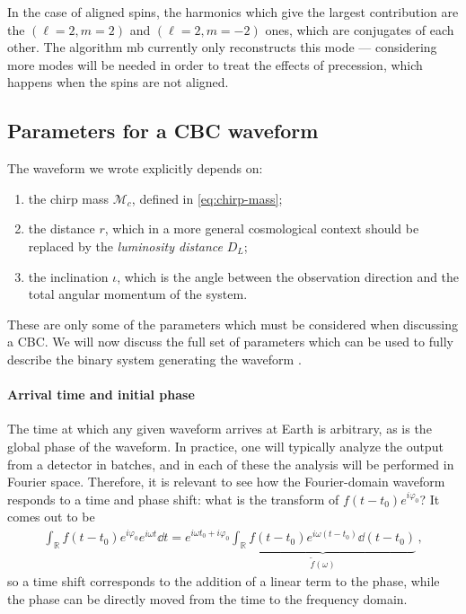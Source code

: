 \documentclass[main.tex]{subfiles}
\begin{document}
In the case of aligned spins, the harmonics which give the largest contribution are the \((\ell = 2, m = 2)\) and \((\ell = 2, m =-2)\) ones, which are conjugates of each other. 
The algorithm \ac{mb} currently only reconstructs this mode ---
considering more modes will be needed in order to treat the effects of precession, which happens when the spins are not aligned. 


\subsection{Parameters for a \ac{CBC} waveform}

The waveform we wrote explicitly depends on: 
\begin{enumerate}
    \item the chirp mass \(\mathcal{M}_c\), defined in \eqref{eq:chirp-mass};
    \item the distance \(r\), which in a more general cosmological context should be replaced by the \emph{luminosity distance} \(D_L\);
    \item the inclination \(\iota \), which is the angle between the observation direction and the total angular momentum of the system.
\end{enumerate}

These are only some of the parameters which must be considered when discussing a \ac{CBC}. We will now discuss the full set of parameters which can be used to fully describe the binary system generating the waveform \cite[eq.\ 21]{breschiTtBajesBayesian2021}. 

\paragraph{Arrival time and initial phase}

The time at which any given waveform arrives at Earth is arbitrary, as is the global phase of the waveform. 
In practice, one will typically analyze the output from a detector in batches, and in each of these the analysis will be performed in Fourier space. 
Therefore, it is relevant to see how the Fourier-domain waveform responds to a time and phase shift: what is the transform of \(f(t-t_0 ) e^{i \varphi_0} \)? It comes out to be 
%
\begin{align}
\int_{\mathbb{R}} f(t-t_0 ) e^{i \varphi_0 } e^{i \omega t} \dd{t}  = e^{i \omega t_0 + i \varphi_0} \underbrace{\int_{\mathbb{R}} f(t-t_0 ) e^{i \omega (t-t_0 )} \dd{(t-t_0 )}}_{\widetilde{f}(\omega )}
\,,
\end{align}
%
so a time shift corresponds to the addition of a linear term to the phase, while the phase can be directly moved from the time to the frequency domain. 
\end{document}
